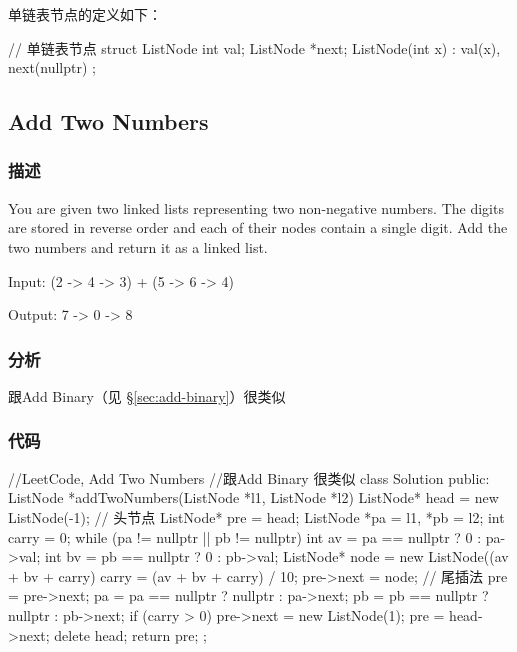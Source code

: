 单链表节点的定义如下：
\begin{Code}
// 单链表节点
struct ListNode {
    int val;
    ListNode *next;
    ListNode(int x) : val(x), next(nullptr) { }
};
\end{Code}


\subsection{Add Two Numbers}
\label{sec:add-two-numbers}


\subsubsection{描述}
You are given two linked lists representing two non-negative numbers. The digits are stored in reverse order and each of their nodes contain a single digit. Add the two numbers and return it as a linked list.

Input: {\small {} (2 -> 4 -> 3) + (5 -> 6 -> 4)}

Output: {\small {} 7 -> 0 -> 8}


\subsubsection{分析}
跟Add Binary（见 \S \ref{sec:add-binary}）很类似


\subsubsection{代码}
\begin{Code}
//LeetCode, Add Two Numbers
//跟Add Binary 很类似
class Solution {
public:
    ListNode *addTwoNumbers(ListNode *l1, ListNode *l2) {
        ListNode* head = new ListNode(-1); // 头节点
        ListNode* pre = head;
        ListNode *pa = l1, *pb = l2;
        int carry = 0;
        while (pa != nullptr || pb != nullptr) {
            int av = pa == nullptr ? 0 : pa->val;
            int bv = pb == nullptr ? 0 : pb->val;
            ListNode* node = new ListNode((av + bv + carry) %
            carry = (av + bv + carry) / 10;
            pre->next = node; // 尾插法
            pre = pre->next;
            pa = pa == nullptr ? nullptr : pa->next;
            pb = pb == nullptr ? nullptr : pb->next;
        }
        if (carry > 0)
            pre->next = new ListNode(1);
        pre = head->next;
        delete head;
        return pre;
    }
};
\end{Code}


